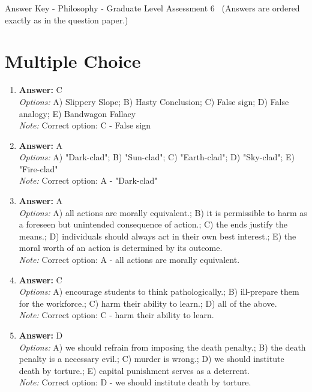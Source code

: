 \documentclass[12pt]{article}
\begin{document}
\begin{center}
Answer Key - Philosophy - Graduate Level Assessment 6 \
\small (Answers are ordered exactly as in the question paper.)
\end{center}

\section*{Multiple Choice}
\begin{enumerate}[label=\arabic*.]
\item \textbf{Answer:} C
\\ \textit{Options:} A) Slippery Slope; B) Hasty Conclusion; C) False sign; D) False analogy; E) Bandwagon Fallacy
\\ \textit{Note:} Correct option: C - False sign
\item \textbf{Answer:} A
\\ \textit{Options:} A) "Dark-clad"; B) "Sun-clad"; C) "Earth-clad"; D) "Sky-clad"; E) "Fire-clad"
\\ \textit{Note:} Correct option: A - "Dark-clad"
\item \textbf{Answer:} A
\\ \textit{Options:} A) all actions are morally equivalent.; B) it is permissible to harm as a foreseen but unintended consequence of action.; C) the ends justify the means.; D) individuals should always act in their own best interest.; E) the moral worth of an action is determined by its outcome.
\\ \textit{Note:} Correct option: A - all actions are morally equivalent.
\item \textbf{Answer:} C
\\ \textit{Options:} A) encourage students to think pathologically.; B) ill-prepare them for the workforce.; C) harm their ability to learn.; D) all of the above.
\\ \textit{Note:} Correct option: C - harm their ability to learn.
\item \textbf{Answer:} D
\\ \textit{Options:} A) we should refrain from imposing the death penalty.; B) the death penalty is a necessary evil.; C) murder is wrong.; D) we should institute death by torture.; E) capital punishment serves as a deterrent.
\\ \textit{Note:} Correct option: D - we should institute death by torture.
\end{enumerate}
\end{document}
